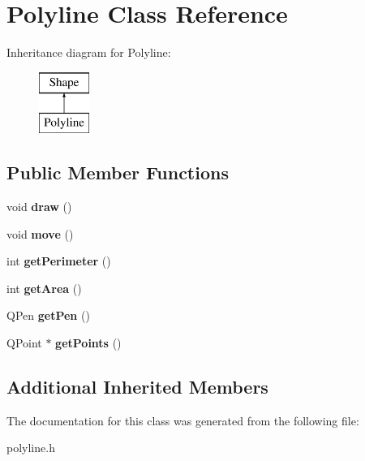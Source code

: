 \hypertarget{class_polyline}{}\section{Polyline Class Reference}
\label{class_polyline}
Inheritance diagram for Polyline\+:\begin{figure}[H]
\begin{center}
\leavevmode
\includegraphics[height=2.000000cm]{class_polyline}
\end{center}
\end{figure}
\subsection*{Public Member Functions}
\begin{DoxyCompactItemize}
\item 
\mbox{\label{class_polyline_a21ea8147cb2a0d8d9b61af7b62520395}} 
void {\bfseries draw} ()
\item 
\mbox{\label{class_polyline_a6a94f8224305b0a63425ab434cf70c33}} 
void {\bfseries move} ()
\item 
\mbox{\label{class_polyline_a330517ebe729fea9157474f169c8f412}} 
int {\bfseries get\+Perimeter} ()
\item 
\mbox{\label{class_polyline_aac434c98a3e3e11ca89d605fe1b7e469}} 
int {\bfseries get\+Area} ()
\item 
\mbox{\label{class_polyline_a02e173040039bad2dabc022f73957091}} 
Q\+Pen {\bfseries get\+Pen} ()
\item 
\mbox{\label{class_polyline_a08321eef3c83d6b3ee8d9dab29f6aaf9}} 
Q\+Point $\ast$ {\bfseries get\+Points} ()
\end{DoxyCompactItemize}
\subsection*{Additional Inherited Members}


The documentation for this class was generated from the following file\+:\begin{DoxyCompactItemize}
\item 
polyline.\+h\end{DoxyCompactItemize}
